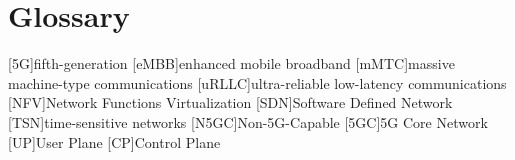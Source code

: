 \chapter{Glossary}

\footnotesize
\SingleSpacing

\begin{multicols}{2}
\begin{acronym}[AAAAAA]

	[5G]{fifth-generation}
	[eMBB]{enhanced mobile broadband}
	[mMTC]{massive machine-type communications}
	[uRLLC]{ultra-reliable low-latency communications}
	[NFV]{Network Functions Virtualization}
	[SDN]{Software Defined Network}
	[TSN]{time-sensitive networks}
	[N5GC]{Non-5G-Capable}
	[5GC]{5G Core Network}
	[UP]{User Plane}
	[CP]{Control Plane}

\end{acronym}
\end{multicols}

